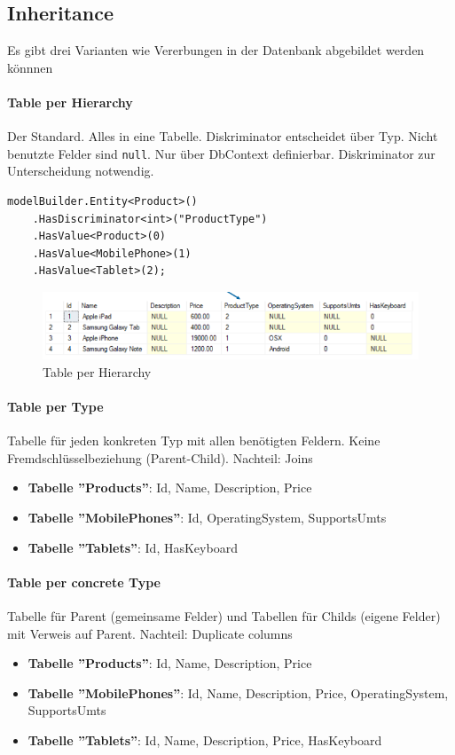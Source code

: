 \documentclass[
a4paper,
oneside,
10pt,
fleqn,
headsepline,
toc=listofnumbered, 
bibliography=totocnumbered]{scrartcl}
\begin{document}
\subsection{Inheritance}
Es gibt drei Varianten wie Vererbungen in der Datenbank abgebildet werden könnnen

\paragraph{Table per Hierarchy} Der Standard. Alles in eine Tabelle. Diskriminator entscheidet über Typ. Nicht benutzte Felder sind \lstinline|null|. Nur über DbContext definierbar. Diskriminator zur Unterscheidung notwendig.
\begin{lstlisting}
modelBuilder.Entity<Product>()
    .HasDiscriminator<int>("ProductType")
    .HasValue<Product>(0)
    .HasValue<MobilePhone>(1)
    .HasValue<Tablet>(2);
\end{lstlisting}
\begin{figure}[h!]
\centering
\includegraphics[width=0.8\linewidth]{images/table_per_hierarchy.png}
\caption{Table per Hierarchy}
\end{figure}

\paragraph{Table per Type} Tabelle für jeden konkreten Typ mit allen benötigten Feldern. Keine Fremdschlüsselbeziehung (Parent-Child). Nachteil: Joins
\begin{itemize}
    \item \textbf{Tabelle ''Products''}: Id, Name, Description, Price
    \item \textbf{Tabelle ''MobilePhones''}: Id, OperatingSystem, SupportsUmts
    \item \textbf{Tabelle ''Tablets''}: Id, HasKeyboard
\end{itemize}

\paragraph{Table per concrete Type} Tabelle für Parent (gemeinsame Felder) und Tabellen für Childs (eigene Felder) mit Verweis auf Parent. Nachteil: Duplicate columns
\begin{itemize}
    \item \textbf{Tabelle ''Products''}: Id, Name, Description, Price
    \item \textbf{Tabelle ''MobilePhones''}: Id, Name, Description, Price, OperatingSystem, SupportsUmts
    \item \textbf{Tabelle ''Tablets''}: Id, Name, Description, Price, HasKeyboard
\end{itemize}
\end{document}
